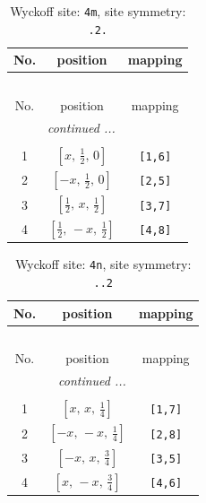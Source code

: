 \documentclass[fleqn,8pt]{jsarticle}
\begin{document}
\renewcommand{\arraystretch}{1.2}
\begin{longtable}{ccc}
\caption{Wyckoff site: {\tt 4m}, site symmetry: {\tt .2.}}
 \\
 \hline \hline
No. & position & mapping \\ \hline \endfirsthead

\multicolumn{2}{l}{\tablename\ \thetable{}} \\
 \hline \hline
No. & position & mapping \\ \hline \endhead

 \hline \hline
\multicolumn{2}{r}{\footnotesize\it continued ...} \\ \endfoot

 \hline \hline
\multicolumn{2}{r}{} \\ \endlastfoot

1 & $\left[ x,\, \frac{1}{2},\, 0 \right]$ & {\tt [1,6]} \\ \hline
2 & $\left[ - x,\, \frac{1}{2},\, 0 \right]$ & {\tt [2,5]} \\ \hline
3 & $\left[ \frac{1}{2},\, x,\, \frac{1}{2} \right]$ & {\tt [3,7]} \\ \hline
4 & $\left[ \frac{1}{2},\, - x,\, \frac{1}{2} \right]$ & {\tt [4,8]} \\
\end{longtable}
\renewcommand{\arraystretch}{1.2}
\begin{longtable}{ccc}
\caption{Wyckoff site: {\tt 4n}, site symmetry: {\tt ..2}}
 \\
 \hline \hline
No. & position & mapping \\ \hline \endfirsthead

\multicolumn{2}{l}{\tablename\ \thetable{}} \\
 \hline \hline
No. & position & mapping \\ \hline \endhead

 \hline \hline
\multicolumn{2}{r}{\footnotesize\it continued ...} \\ \endfoot

 \hline \hline
\multicolumn{2}{r}{} \\ \endlastfoot

1 & $\left[ x,\, x,\, \frac{1}{4} \right]$ & {\tt [1,7]} \\ \hline
2 & $\left[ - x,\, - x,\, \frac{1}{4} \right]$ & {\tt [2,8]} \\ \hline
3 & $\left[ - x,\, x,\, \frac{3}{4} \right]$ & {\tt [3,5]} \\ \hline
4 & $\left[ x,\, - x,\, \frac{3}{4} \right]$ & {\tt [4,6]} \\
\end{longtable}
\end{document}
